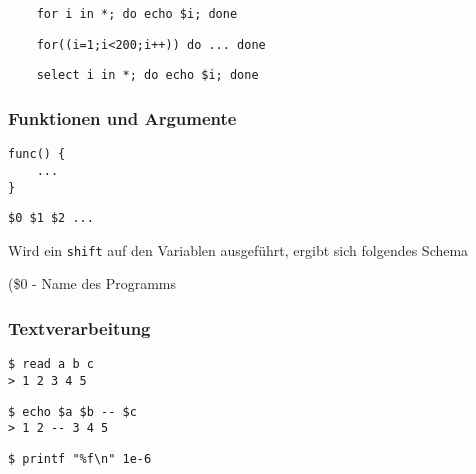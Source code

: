 			\begin{lstlisting}
	for i in *; do echo $i; done
			\end{lstlisting}
			\lstBash
			\begin{lstlisting}
	for((i=1;i<200;i++)) do ... done
			\end{lstlisting}
			\begin{lstlisting}
	select i in *; do echo $i; done
			\end{lstlisting}
		

		\subsubsection*{Funktionen und Argumente} %
		\label{ssub:funktionen_und_argumente}
		
			\begin{lstlisting}
func() {
	...
}
			\end{lstlisting}
			\lstBash
			\begin{lstlisting}
$0 $1 $2 ...
			\end{lstlisting}
			Wird ein \texttt{shift} auf den Variablen ausgeführt, ergibt sich folgendes Schema\\
(\$0 - Name des Programms

		\subsubsection*{Textverarbeitung} %
		\label{ssub:textverarbeitung}
		
		\begin{lstlisting}
$ read a b c
> 1 2 3 4 5
		\end{lstlisting}
		\begin{lstlisting}
$ echo $a $b -- $c
> 1 2 -- 3 4 5
		\end{lstlisting}
		\begin{lstlisting}
$ printf "%f\n" 1e-6
		\end{lstlisting}

